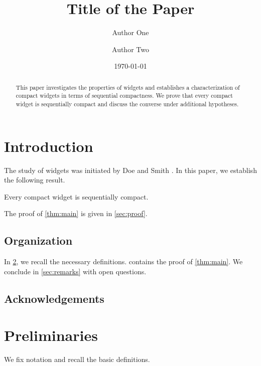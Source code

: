 \documentclass[12pt]{amsart}
\title{Title of the Paper}
\author{Author One}
\author{Author Two}
\date{\today}
\theoremstyle{plain}
\begin{document}
\begin{abstract}
  This paper investigates the properties of widgets
  and establishes a characterization of compact widgets
  in terms of sequential compactness.
  We prove that every compact widget is sequentially compact
  and discuss the converse under additional hypotheses.
\end{abstract}

\maketitle

\section{Introduction}\label{sec:introduction}

The study of widgets was initiated by Doe and Smith \autocite{placeholder2025}.
In this paper, we establish the following result.

\begin{theorem}\label{thm:main}
  Every compact widget is sequentially compact.
\end{theorem}

The proof of \cref{thm:main} is given in \cref{sec:proof}.

\subsection*{Organization}

In \cref{sec:preliminaries}, we recall the necessary definitions.
 contains the proof of \cref{thm:main}.
We conclude in \cref{sec:remarks} with open questions.

\subsection*{Acknowledgements}


\section{Preliminaries}\label{sec:preliminaries}

We fix notation and recall the basic definitions.
\end{document}
